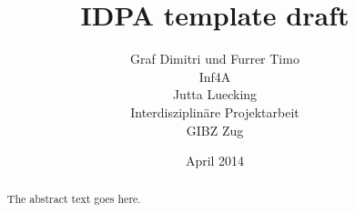 \documentclass[12pt,titlepage]{article}
\begin{document}
\title{IDPA template draft}
\author{Graf Dimitri und Furrer Timo\\
  Inf4A\\
  Jutta Luecking\\
  Interdisziplinäre Projektarbeit\\
  GIBZ Zug}
\date{April 2014}
\maketitle

\tableofcontents
\newpage

\begin{abstract}
The abstract text goes here.
\end{abstract}


\end{document}
